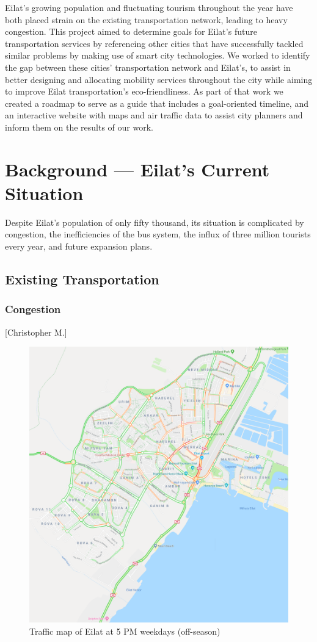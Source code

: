 \documentclass[12pt]{article}                       %
\begin{document}
Eilat's growing population and fluctuating tourism throughout the year have both placed strain on the existing transportation network, leading to heavy congestion. This project aimed to determine goals for Eilat's future transportation services by referencing other cities that have successfully tackled similar problems by making use of smart city technologies. We worked to identify the gap between these cities' transportation network and Eilat's, to assist in better designing and allocating mobility services throughout the city while aiming to improve Eilat transportation's eco-friendliness. As part of that work we created a roadmap to serve as a guide that includes a goal-oriented timeline, and an interactive website with maps and air traffic data to assist city planners and inform them on the results of our work.
 
\newpage
\section{Background --- Eilat's Current Situation }
Despite Eilat's population of only fifty thousand, its situation is complicated by congestion, the inefficiencies of the bus system, the influx of three million tourists every year, and future expansion plans.

\subsection{Existing Transportation}
\subsubsection{Congestion}[Christopher M.]

\begin{figure}[H]
    \centering
    \includegraphics[scale=1]{images/eilat_traffic.png}
    \caption{Traffic map of Eilat at 5 PM weekdays (off-season)}
    \label{img:eilatTraffic}
\end{figure}
\end{document}
